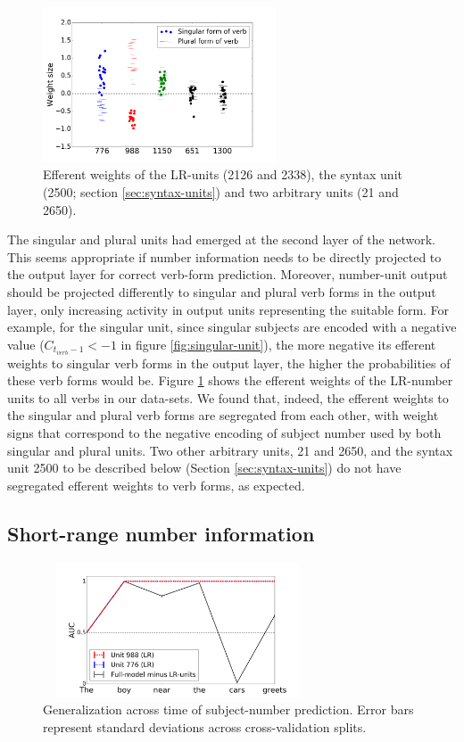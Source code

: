 \begin{figure}[b]
    \centering
    \includegraphics[height=4.6cm]{Figures/weight_dists_verbs.png}
    \caption{Efferent weights of the LR-units (\unit{2}{126} and \unit{2}{338}), the syntax unit (\unit{2}{500}; section \ref{sec:syntax-units}) and two arbitrary units (\unit{2}{1} and \unit{2}{650}).}
    \label{fig:output-weights}
\end{figure}

The singular and plural units had emerged at the second layer of the network. This seems appropriate if number information needs to be directly projected to the output layer for correct verb-form prediction. Moreover, number-unit output should be projected differently to singular and plural verb forms in the output layer, only increasing activity in output units representing the suitable form. For example, for the singular unit, since singular subjects are encoded with a negative value ($C_{t_{verb}-1}<-1$ in figure \ref{fig:singular-unit}), the more negative its efferent weights to singular verb forms in the output layer, the higher the probabilities of these verb forms would be. Figure \ref{fig:output-weights} shows the efferent weights of the LR-number units to all verbs in our data-sets. We found that, indeed, the efferent weights to the singular and plural verb forms are segregated from each other, with weight signs that correspond to the negative encoding of subject number used by both singular and plural units. Two other arbitrary units, \unit{2}{1} and \unit{2}{650}, and the syntax unit \unit{2}{500} to be described below (Section \ref{sec:syntax-units}) do not have segregated efferent weights to verb forms, as expected. 

\subsection{Short-range number information}
\begin{figure}
    \centering
    \includegraphics[height=4cm, width=8cm]{Figures/GAT1d_cell_.png}
    \caption{Generalization across time of subject-number prediction. Error bars represent standard deviations across cross-validation splits.}
    \label{fig:GAT}
\end{figure}

